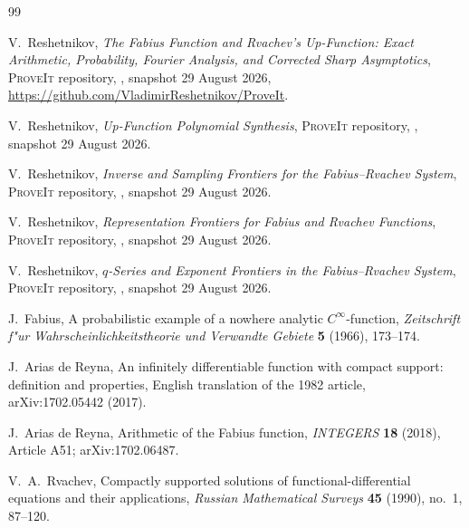 \documentclass[11pt,oneside]{article}
\theoremstyle{definition}
\theoremstyle{remark}
\newcommand{\Repo}{\textsc{ProveIt}}
\begin{document}
\begin{thebibliography}{99}

V.~Reshetnikov,
\newblock \emph{The Fabius Function and Rvachev's Up-Function: Exact
Arithmetic, Probability, Fourier Analysis, and Corrected Sharp Asymptotics},
\newblock \Repo{} repository,
,
snapshot 29 August 2026,
\newblock \url{https://github.com/VladimirReshetnikov/ProveIt}.

V.~Reshetnikov,
\newblock \emph{Up-Function Polynomial Synthesis},
\newblock \Repo{} repository,
,
snapshot 29 August 2026.

V.~Reshetnikov,
\newblock \emph{Inverse and Sampling Frontiers for the Fabius--Rvachev System},
\newblock \Repo{} repository,
,
snapshot 29 August 2026.

V.~Reshetnikov,
\newblock \emph{Representation Frontiers for Fabius and Rvachev Functions},
\newblock \Repo{} repository,
,
snapshot 29 August 2026.

V.~Reshetnikov,
\newblock \emph{$q$-Series and Exponent Frontiers in the Fabius--Rvachev
System},
\newblock \Repo{} repository,
,
snapshot 29 August 2026.

J.~Fabius,
\newblock A probabilistic example of a nowhere analytic $C^\infty$-function,
\newblock \emph{Zeitschrift f"ur Wahrscheinlichkeitstheorie und Verwandte
Gebiete} \textbf{5} (1966), 173--174.

J.~Arias de Reyna,
\newblock An infinitely differentiable function with compact support:
definition and properties,
\newblock English translation of the 1982 article, arXiv:1702.05442 (2017).

J.~Arias de Reyna,
\newblock Arithmetic of the Fabius function,
\newblock \emph{INTEGERS} \textbf{18} (2018), Article A51;
arXiv:1702.06487.

V.~A.~Rvachev,
\newblock Compactly supported solutions of functional-differential equations
and their applications,
\newblock \emph{Russian Mathematical Surveys} \textbf{45} (1990), no.~1,
87--120.


\end{thebibliography}
\end{document}
